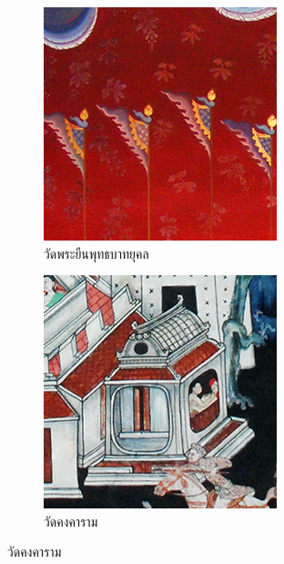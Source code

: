 \begin{figure}[H]
\begin{subfigure}{0.4\linewidth}
    \end{subfigure}
    \begin{subfigure}{0.4\linewidth}
        \centering
        \includegraphics[width=0.8\linewidth]{image/thaiart/case03-original.png}
        \caption{วัดพระยืนพุทธบาทยุคล}
        \label{image:thaiart_case03_original}			
    \end{subfigure}		
    \begin{subfigure}{0.4\linewidth}
        \centering
        \includegraphics[width=0.8\linewidth]{image/thaiart/case04-original.png}
        \caption{วัดคงคาราม}
        \label{image:thaiart_case04_original}			

\end{subfigure}
\end{figure}
